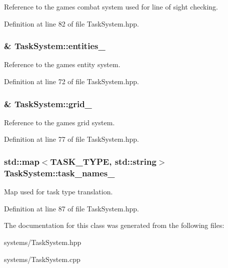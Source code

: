 Reference to the game\textquotesingle{}s combat system used for line of sight checking. 



Definition at line 82 of file Task\+System.\+hpp.

\subsubsection[{\texorpdfstring{entities\+\_\+}{entities_}}]{\& Task\+System\+::entities\+\_\+\hspace{0.3cm}{\ttfamily [private]}}\hypertarget{class_task_system_a92fe2ce299d1d92fed4808759795208c}{}\label{class_task_system_a92fe2ce299d1d92fed4808759795208c}


Reference to the game\textquotesingle{}s entity system. 



Definition at line 72 of file Task\+System.\+hpp.

\subsubsection[{\texorpdfstring{grid\+\_\+}{grid_}}]{\& Task\+System\+::grid\+\_\+\hspace{0.3cm}{\ttfamily [private]}}\hypertarget{class_task_system_a243548d95e14a6e25c30b6cd30dff93b}{}\label{class_task_system_a243548d95e14a6e25c30b6cd30dff93b}


Reference to the game\textquotesingle{}s grid system. 



Definition at line 77 of file Task\+System.\+hpp.

\subsubsection[{\texorpdfstring{task\+\_\+names\+\_\+}{task_names_}}]{\setlength{\rightskip}{0pt plus 5cm}std\+::map$<$T\+A\+S\+K\+\_\+\+T\+Y\+PE, std\+::string$>$ Task\+System\+::task\+\_\+names\+\_\+\hspace{0.3cm}{\ttfamily [private]}}\hypertarget{class_task_system_aac7221e5575b4bf4514f1f2a84973a8e}{}\label{class_task_system_aac7221e5575b4bf4514f1f2a84973a8e}


Map used for task type translation. 



Definition at line 87 of file Task\+System.\+hpp.



The documentation for this class was generated from the following files\+:\begin{DoxyCompactItemize}
\item 
systems/Task\+System.\+hpp\item 
systems/Task\+System.\+cpp\end{DoxyCompactItemize}
